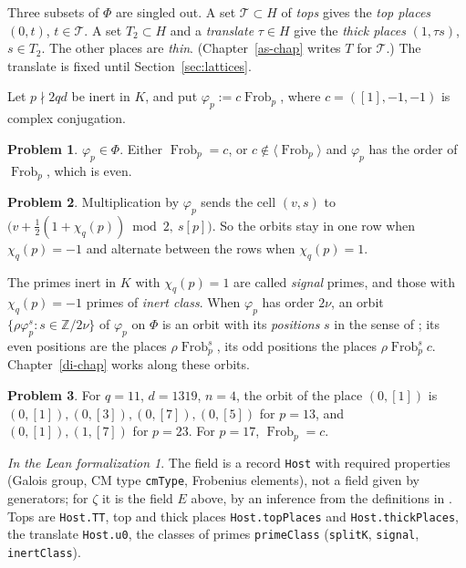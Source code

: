 \documentclass[reqno]{amsart}
\newcounter{chap}
\theoremstyle{definition}
\newtheorem{problem}{Problem}[section]
\theoremstyle{plain}
\theoremstyle{remark}
\newtheorem*{leanremark}{In the Lean formalization}
\newcommand{\Z}{\mathbb Z}
\newcommand{\Tc}{\mathcal T}
\newcommand{\Frob}{\operatorname{Frob}}
\newcommand{\tl}[1]{\texttt{#1}}
\begin{document}
Three subsets of \(\Phi\) are singled out.  A set \(\Tc\subset H\) of \emph{tops} gives the \emph{top places} \((0,t)\), \(t\in\Tc\).  A set \(T_2\subset H\) and a \emph{translate} \(\tau\in H\) give the \emph{thick places} \((1,\tau s)\), \(s\in T_2\).  The other places are \emph{thin}.  (Chapter~\ref{as-chap} writes \(T\) for \(\Tc\).)  The translate is fixed until Section~\ref{sec:lattices}.

Let \(p\nmid 2qd\) be inert in \(K\), and put \(\varphi_p:=c\Frob_p\), where \(c=([1],-1,-1)\) is complex conjugation.

\begin{problem}\label{pr:orbit}
\(\varphi_p\in\Phi\).  Either \(\Frob_p=c\), or \(c\notin\langle\Frob_p\rangle\) and \(\varphi_p\) has the order of \(\Frob_p\), which is even.
\end{problem}

\begin{problem}\label{pr:rows}
Multiplication by \(\varphi_p\) sends the cell \((v,s)\) to \(\bigl(v+\frac12(1+\chi_q(p))\bmod 2,\ s[p]\bigr)\).  So the orbits stay in one row when \(\chi_q(p)=-1\) and alternate between the rows when \(\chi_q(p)=1\).
\end{problem}

The primes inert in \(K\) with \(\chi_q(p)=1\) are called \emph{signal} primes, and those with \(\chi_q(p)=-1\) primes of \emph{inert class}.  When \(\varphi_p\) has order \(2\nu\), an orbit \(\{\rho\varphi_p^s:s\in\Z/2\nu\}\) of \(\varphi_p\) on \(\Phi\) is an orbit with its \emph{positions} \(s\) in the sense of \cite[\S11.1]{Adr}; its even positions are the places \(\rho\Frob_p^s\), its odd positions the places \(\rho\Frob_p^sc\).  Chapter~\ref{di-chap} works along these orbits.

\begin{problem}\label{pr:orbit-example}
For \(q=11\), \(d=1319\), \(n=4\), the orbit of the place \((0,[1])\) is \((0,[1]),(0,[3]),(0,[7]),(0,[5])\) for \(p=13\), and \((0,[1]),(1,[7])\) for \(p=23\).  For \(p=17\), \(\Frob_p=c\).
\end{problem}

\begin{leanremark}
\raggedright The field is a record \tl{Host} with required properties (Galois group, CM type \tl{cmType}, Frobenius elements), not a field given by generators; for \(\zeta\) it is the field \(E\) above, by an inference from the definitions in \cite[\S III.10, \S9, Remark~(1)]{Rub}.  Tops are \tl{Host.TT}, top and thick places \tl{Host.topPlaces} and \tl{Host.thickPlaces}, the translate \tl{Host.u0}, the classes of primes \tl{primeClass} (\tl{splitK}, \tl{signal}, \tl{inertClass}).
\end{leanremark}
\end{document}
